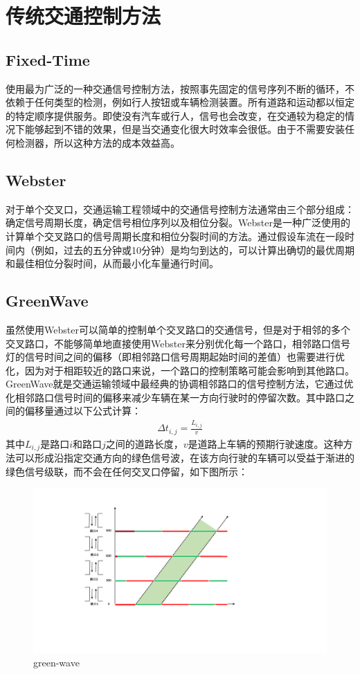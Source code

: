 \section{传统交通控制方法}
\subsection{Fixed-Time}
使用最为广泛的一种交通信号控制方法，按照事先固定的信号序列不断的循环，不依赖于任何类型的检测，例如行人按钮或车辆检测装置。所有道路和运动都以恒定的特定顺序提供服务。即使没有汽车或行人，信号也会改变，在交通较为稳定的情况下能够起到不错的效果，但是当交通变化很大时效率会很低。由于不需要安装任何检测器，所以这种方法的成本效益高。

\subsection{Webster}
对于单个交叉口，交通运输工程领域中的交通信号控制方法通常由三个部分组成：确定信号周期长度，确定信号相位序列以及相位分裂。Webster是一种广泛使用的计算单个交叉路口的信号周期长度和相位分裂时间的方法。通过假设车流在一段时间内（例如，过去的五分钟或10分钟）是均匀到达的，可以计算出确切的最优周期和最佳相位分裂时间，从而最小化车量通行时间。

\subsection{GreenWave}
虽然使用Webster可以简单的控制单个交叉路口的交通信号，但是对于相邻的多个交叉路口，不能够简单地直接使用Webster来分别优化每一个路口，相邻路口信号灯的信号时间之间的偏移（即相邻路口信号周期起始时间的差值）也需要进行优化，因为对于相距较近的路口来说，一个路口的控制策略可能会影响到其他路口。
GreenWave就是交通运输领域中最经典的协调相邻路口的信号控制方法，它通过优化相邻路口信号时间的偏移来减少车辆在某一方向行驶时的停留次数。其中路口之间的偏移量通过以下公式计算：
\begin{align}
    \label{eq:green-wave}
    \Delta t_{i, j}=\frac{L_{i, j}}{v}
\end{align}
其中$L_{i, j}$是路口$i$和路口$j$之间的道路长度，$v$是道路上车辆的预期行驶速度。这种方法可以形成沿指定交通方向的绿色信号波，在该方向行驶的车辆可以受益于渐进的绿色信号级联，而不会在任何交叉口停留，如下图所示：
\begin{figure}[htb]
    \includegraphics[width=1.2\textwidth]{fig/green-ware.pdf}
    \caption{green-wave}
    \label{fig:green-wave}
\end{figure}

